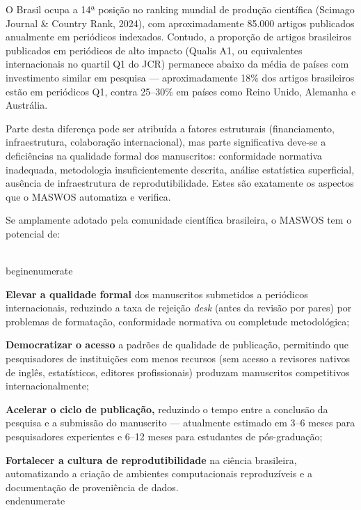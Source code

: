 O Brasil ocupa a 14ª posição no ranking mundial de produção
científica (Scimago Journal \& Country Rank, 2024), com
aproximadamente 85.000 artigos publicados anualmente em
periódicos indexados. Contudo, a proporção de artigos brasileiros
publicados em periódicos de alto impacto (Qualis A1, ou
equivalentes internacionais no quartil Q1 do JCR) permanece
abaixo da média de países com investimento similar em pesquisa —
aproximadamente 18\% dos artigos brasileiros estão em periódicos
Q1, contra 25--30\% em países como Reino Unido, Alemanha e
Austrália.

Parte desta diferença pode ser atribuída a fatores estruturais
(financiamento, infraestrutura, colaboração internacional), mas
parte significativa deve-se a deficiências na qualidade formal
dos manuscritos: conformidade normativa inadequada, metodologia
insuficientemente descrita, análise estatística superficial,
ausência de infraestrutura de reprodutibilidade. Estes são
exatamente os aspectos que o MASWOS automatiza e verifica.

Se amplamente adotado pela comunidade científica brasileira, o
MASWOS tem o potencial de:

\\begin{enumerate}
    \item \textbf{Elevar a qualidade formal} dos manuscritos
    submetidos a periódicos internacionais, reduzindo a taxa de
    rejeição \textit{desk} (antes da revisão por pares) por
    problemas de formatação, conformidade normativa ou
    completude metodológica;

    \item \textbf{Democratizar o acesso} a padrões de
    qualidade de publicação, permitindo que pesquisadores de
    instituições com menos recursos (sem acesso a revisores
    nativos de inglês, estatísticos, editores profissionais)
    produzam manuscritos competitivos internacionalmente;

    \item \textbf{Acelerar o ciclo de publicação,}
    reduzindo o tempo entre a conclusão da pesquisa e a
    submissão do manuscrito — atualmente estimado em 3--6
    meses para pesquisadores experientes e 6--12 meses para
    estudantes de pós-graduação;

    \item \textbf{Fortalecer a cultura de
    reprodutibilidade} na ciência brasileira, automatizando a
    criação de ambientes computacionais reproduzíveis e a
    documentação de proveniência de dados.
\\end{enumerate}

